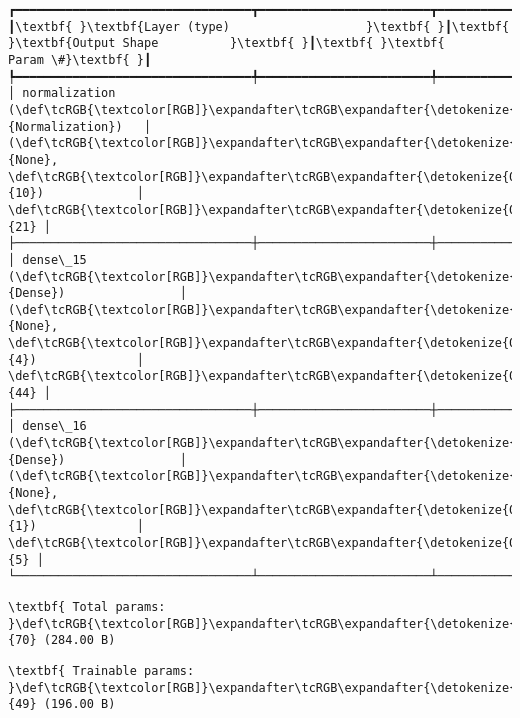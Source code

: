 \documentclass[11pt]{article}
\begin{document}
    \begin{Verbatim}[commandchars=\\\{\}]
┏━━━━━━━━━━━━━━━━━━━━━━━━━━━━━━━━━┳━━━━━━━━━━━━━━━━━━━━━━━━┳━━━━━━━━━━━━━━━┓
┃\textbf{ }\textbf{Layer (type)                   }\textbf{ }┃\textbf{ }\textbf{Output Shape          }\textbf{ }┃\textbf{ }\textbf{      Param \#}\textbf{ }┃
┡━━━━━━━━━━━━━━━━━━━━━━━━━━━━━━━━━╇━━━━━━━━━━━━━━━━━━━━━━━━╇━━━━━━━━━━━━━━━┩
│ normalization (\def\tcRGB{\textcolor[RGB]}\expandafter\tcRGB\expandafter{\detokenize{0,135,255}}{Normalization})   │ (\def\tcRGB{\textcolor[RGB]}\expandafter\tcRGB\expandafter{\detokenize{0,215,255}}{None}, \def\tcRGB{\textcolor[RGB]}\expandafter\tcRGB\expandafter{\detokenize{0,175,0}}{10})             │            \def\tcRGB{\textcolor[RGB]}\expandafter\tcRGB\expandafter{\detokenize{0,175,0}}{21} │
├─────────────────────────────────┼────────────────────────┼───────────────┤
│ dense\_15 (\def\tcRGB{\textcolor[RGB]}\expandafter\tcRGB\expandafter{\detokenize{0,135,255}}{Dense})                │ (\def\tcRGB{\textcolor[RGB]}\expandafter\tcRGB\expandafter{\detokenize{0,215,255}}{None}, \def\tcRGB{\textcolor[RGB]}\expandafter\tcRGB\expandafter{\detokenize{0,175,0}}{4})              │            \def\tcRGB{\textcolor[RGB]}\expandafter\tcRGB\expandafter{\detokenize{0,175,0}}{44} │
├─────────────────────────────────┼────────────────────────┼───────────────┤
│ dense\_16 (\def\tcRGB{\textcolor[RGB]}\expandafter\tcRGB\expandafter{\detokenize{0,135,255}}{Dense})                │ (\def\tcRGB{\textcolor[RGB]}\expandafter\tcRGB\expandafter{\detokenize{0,215,255}}{None}, \def\tcRGB{\textcolor[RGB]}\expandafter\tcRGB\expandafter{\detokenize{0,175,0}}{1})              │             \def\tcRGB{\textcolor[RGB]}\expandafter\tcRGB\expandafter{\detokenize{0,175,0}}{5} │
└─────────────────────────────────┴────────────────────────┴───────────────┘

    \end{Verbatim}

    
    
    \begin{Verbatim}[commandchars=\\\{\}]
\textbf{ Total params: }\def\tcRGB{\textcolor[RGB]}\expandafter\tcRGB\expandafter{\detokenize{0,175,0}}{70} (284.00 B)

    \end{Verbatim}

    
    
    \begin{Verbatim}[commandchars=\\\{\}]
\textbf{ Trainable params: }\def\tcRGB{\textcolor[RGB]}\expandafter\tcRGB\expandafter{\detokenize{0,175,0}}{49} (196.00 B)

    \end{Verbatim}
\end{document}
